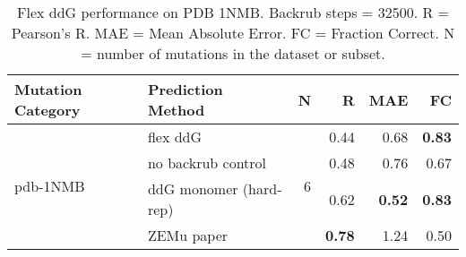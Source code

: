 \begin{table}
  \begin{tabular}{llrrrr}
\toprule
Mutation Category &       Prediction Method &  N &    R &  MAE &   FC \\
\midrule
 \multirow{ 4}{*}{pdb-1NMB} & flex ddG & \multirow{ 4}{*}{6} & 0.44 & 0.68 & \textbf{0.83}  \\
 & no backrub control & & 0.48 & 0.76 & 0.67  \\
 & ddG monomer (hard-rep) & & 0.62 & \textbf{0.52} & \textbf{0.83}  \\
 & ZEMu paper & & \textbf{0.78} & 1.24 & 0.50  \\
\bottomrule
\end{tabular}
  \caption[Flex ddG performance on PDB 1NMB]{
    Flex ddG performance on PDB 1NMB. Backrub steps = 32500. R = Pearson's R. MAE = Mean Absolute Error. FC = Fraction Correct. N = number of mutations in the dataset or subset.
  } \label{tab:table-pdb-1NMB}
\end{table}
